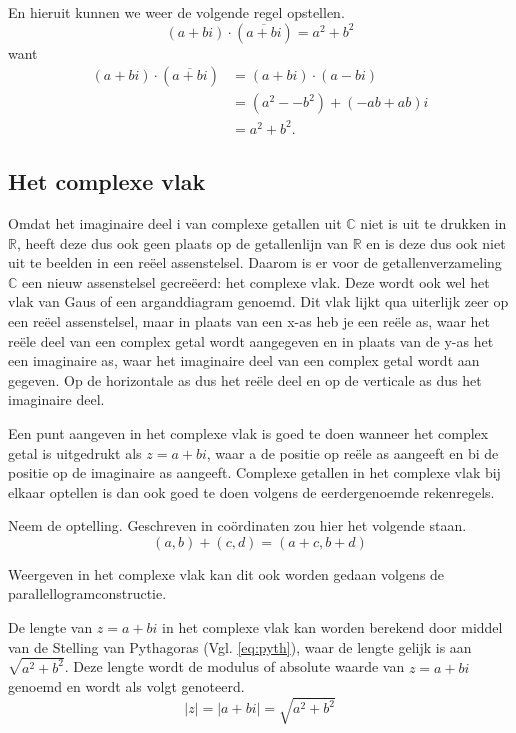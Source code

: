 \documentclass[11pt,fleqn]{book} %
\newcommand*\conj[1]{\overline{#1}}
\begin{document}
En hieruit kunnen we weer de volgende regel opstellen.
\begin{displaymath}
(a+bi)\cdot(\conj{a+bi})=a^2+b^2
\end{displaymath}
want
\begin{displaymath}
\begin{aligned}
(a+bi)\cdot(\conj{a+bi}) &= (a+bi)\cdot(a-bi)\\
&= (a^2--b^2)+(-ab+ab)i\\
&= a^2+b^2.
\end{aligned}
\end{displaymath}

\subsection{Het complexe vlak}
Omdat het imaginaire deel i van complexe getallen uit $\mathbb{C}$ niet is uit te drukken in $\mathbb{R}$, heeft deze dus ook geen plaats op de getallenlijn van $\mathbb{R}$ en is deze dus ook niet uit te beelden in een reëel assenstelsel. Daarom is er voor de getallenverzameling $\mathbb{C}$ een nieuw assenstelsel gecreëerd: het complexe vlak. Deze wordt ook wel het vlak van Gaus of een arganddiagram genoemd. Dit vlak lijkt qua uiterlijk zeer op een reëel assenstelsel, maar in plaats van een x-as heb je een reële as, waar het reële deel van een complex getal wordt aangegeven en in plaats van de y-as het een imaginaire as, waar het imaginaire deel van een complex getal wordt aan gegeven. Op de horizontale as dus het reële deel en op de verticale as dus het imaginaire deel.

Een punt aangeven in het complexe vlak is goed te doen wanneer het complex getal is uitgedrukt als $z = a + bi$, waar a de positie op reële as aangeeft en bi de positie op de imaginaire as aangeeft. Complexe getallen in het complexe vlak bij elkaar optellen is dan ook goed te doen volgens de eerdergenoemde rekenregels.

Neem de optelling. Geschreven in coördinaten zou hier het volgende staan.
\begin{displaymath}
(a,b)+(c,d)=(a+c,b+d)
\end{displaymath}

Weergeven in het complexe vlak kan dit ook worden gedaan volgens de parallellogramconstructie.

De lengte van $z = a + bi$ in het complexe vlak kan worden berekend door middel van de Stelling van Pythagoras (Vgl. \ref{eq:pyth}), waar de lengte gelijk is aan $\sqrt{a^2+b^2}$. Deze lengte wordt de modulus of absolute waarde van $z = a + bi$ genoemd en wordt als volgt genoteerd.
\begin{displaymath}
|z|=|a+bi|=\sqrt{a^2+b^2}
\end{displaymath}
\end{document}

